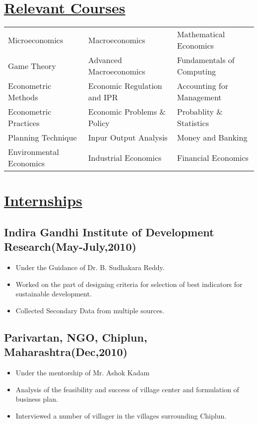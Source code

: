 \documentclass[12pt]{article}
\begin{document}
\section*{\underline {Relevant Courses}}
\begin{center}
\begin{tabular}{|l|l|l|}
	\hline
	Microeconomics & Macroeconomics & Mathematical Economics\\
	Game Theory & Advanced Macroeconomics & Fundamentals of Computing\\
	Econometric Methods & Economic Regulation and IPR & Accounting for Management\\
	Econometric Practices & Economic Problems \& Policy & Probablity \& Statistics\\	
	Planning Technique & Inpur Output Analysis & Money and Banking \\	
	Environmental Economics & Industrial Economics & Financial Economics\\ 
	\hline
\end{tabular}
\end{center}

\section*{\underline {Internships}}
\subsection*{Indira Gandhi Institute of Development Research(May-July,2010)}

\begin{itemize}
	\item Under the Guidance of Dr. B. Sudhakara Reddy.
	\item Worked on the part of designing criteria for selection of best indicators for sustainable development.
	\item Collected Secondary Data from multiple sources.
\end{itemize}

\subsection*{Parivartan, NGO, Chiplun, Maharashtra(Dec,2010)}
\begin{itemize}
	\item Under the mentorship of Mr. Ashok Kadam
	\item Analysis of the feasibility and success of village center and formulation of business plan.
	\item Interviewed a number of villager in the villages surrounding Chiplun.
\end{itemize}
\end{document}
